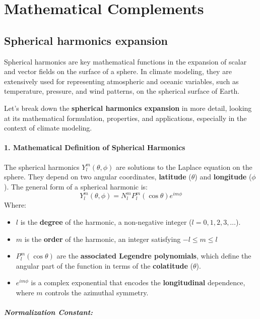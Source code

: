 
\appendix
\chapter{Mathematical Complements }\label{ch:appendixA}
\section{Spherical harmonics expansion}

Spherical harmonics are key mathematical functions in the expansion of scalar and vector fields on the surface of a sphere. In climate modeling, they are extensively used for representing atmospheric and oceanic variables, such as temperature, pressure, and wind patterns, on the spherical surface of Earth.

Let's break down the \textbf{spherical harmonics expansion} in more detail, looking at its mathematical formulation, properties, and applications, especially in the context of climate modeling.

\subsubsection{1. \textbf{Mathematical Definition of Spherical Harmonics}}

The spherical harmonics $Y_l^m(\theta, \phi)$ are solutions to the Laplace equation on the sphere. They depend on two angular coordinates, \textbf{latitude} ($\theta$) and \textbf{longitude} ($\phi$).
The general form of a spherical harmonic is:
$$Y_l^m(\theta,\phi)=N_l^mP_l^m(\cos\theta)e^{im\phi}$$
Where:
\begin{itemize}
    \item $l$ is the \textbf{degree} of the harmonic, a non-negative integer ($l=0,1,2,3,…$).
    \item  $m$ is the \textbf{order} of the harmonic, an integer satisfying $-l\leq m\leq l$  
    \item $P_l^m(\cos\theta)$ are the \textbf{associated Legendre polynomials}, which define the angular part of the function in terms of the \textbf{colatitude} ($\theta$).
    \item $e^{im\phi}$ is a complex exponential that encodes the \textbf{longitudinal} dependence, where $m$ controls the azimuthal symmetry.
\end{itemize}

\paragraph{\textbf{Normalization Constant}:}

